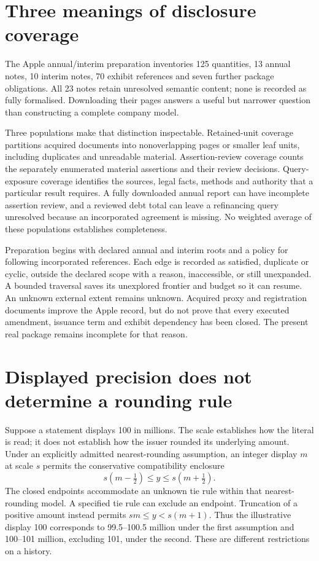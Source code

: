 \section{Three meanings of disclosure coverage}

The Apple annual/interim preparation inventories 125 quantities, 13 annual notes,
10 interim notes, 70 exhibit references and seven further package obligations.
All 23 notes retain unresolved semantic content; none is recorded as fully
formalised. Downloading their pages answers a useful but narrower question
than constructing a complete company model.

Three populations make that distinction inspectable. Retained-unit coverage
partitions acquired documents into nonoverlapping pages or smaller leaf units,
including duplicates and unreadable material. Assertion-review coverage counts
the separately enumerated material assertions and their review decisions.
Query-exposure coverage identifies the sources, legal facts, methods and
authority that a particular result requires. A fully downloaded annual report
can have incomplete assertion review, and a reviewed debt total can leave a
refinancing query unresolved because an incorporated agreement is missing.
No weighted average of these populations establishes completeness.

Preparation begins with declared annual and interim roots and a policy for
following incorporated references. Each edge is recorded as satisfied,
duplicate or cyclic, outside the declared scope with a reason, inaccessible,
or still unexpanded. A bounded traversal saves its unexplored frontier and
budget so it can resume. An unknown external extent remains unknown. Acquired
proxy and registration documents improve the Apple record, but do not prove
that every executed amendment, issuance term and exhibit dependency has been
closed. The present real package remains incomplete for that reason.

\section{Displayed precision does not determine a rounding rule}

Suppose a statement displays 100 in millions. The scale establishes how the
literal is read; it does not establish how the issuer rounded its underlying
amount. Under an explicitly admitted nearest-rounding assumption, an integer
display $m$ at scale $s$ permits the conservative compatibility enclosure
\[
       s(m-\tfrac12)\leq y\leq s(m+\tfrac12).
\]
The closed endpoints accommodate an unknown tie rule within that nearest-rounding
model. A specified tie rule can exclude an endpoint. Truncation of a positive
amount instead permits $sm\leq y<s(m+1)$. Thus the illustrative display 100
corresponds to 99.5--100.5 million under the first assumption and 100--101 million,
excluding 101, under the second. These are different restrictions on a history.

